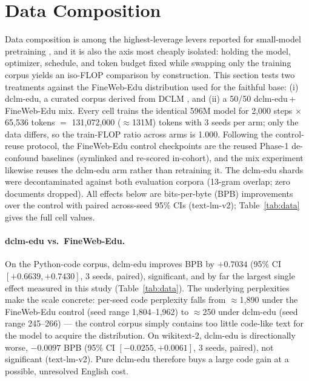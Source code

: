 \section{Data Composition}\label{sec:data}

Data composition is among the highest-leverage levers reported for small-model pretraining \citep{penedo2024fineweb, li2024datacomp, allal2025smollm2}, and it is also the axis most cheaply isolated: holding the model, optimizer, schedule, and token budget fixed while swapping only the training corpus yields an iso-FLOP comparison by construction. This section tests two treatments against the FineWeb-Edu \citep{penedo2024fineweb} distribution used for the faithful base: (i) dclm-edu, a curated corpus derived from DCLM \citep{li2024datacomp}, and (ii) a 50/50 dclm-edu\,+\,FineWeb-Edu mix. Every cell trains the identical 596M model for 2{,}000 steps $\times$ 65{,}536 tokens $=$ 131{,}072{,}000 ($\approx$131M) tokens with 3 seeds per arm; only the data differs, so the train-FLOP ratio across arms is 1.000. Following the control-reuse protocol, the FineWeb-Edu control checkpoints are the reused Phase-1 de-confound baselines (symlinked and re-scored in-cohort), and the mix experiment likewise reuses the dclm-edu arm rather than retraining it. The dclm-edu shards were decontaminated against both evaluation corpora (13-gram overlap; zero documents dropped). All effects below are bits-per-byte (BPB) improvements over the control with paired across-seed 95\% CIs (text-lm-v2); Table~\ref{tab:data} gives the full cell values.



\paragraph{dclm-edu vs.\ FineWeb-Edu.} On the Python-code corpus, dclm-edu improves BPB by $+0.7034$ (95\% CI $[+0.6639, +0.7430]$, 3 seeds, paired), significant, and by far the largest single effect measured in this study (Table~\ref{tab:data}). The underlying perplexities make the scale concrete: per-seed code perplexity falls from $\approx$1{,}890 under the FineWeb-Edu control (seed range 1{,}804--1{,}962) to $\approx$250 under dclm-edu (seed range 245--266) --- the control corpus simply contains too little code-like text for the model to acquire the distribution. On wikitext-2, dclm-edu is directionally worse, $-0.0097$ BPB (95\% CI $[-0.0255, +0.0061]$, 3 seeds, paired), not significant (text-lm-v2). Pure dclm-edu therefore buys a large code gain at a possible, unresolved English cost.

